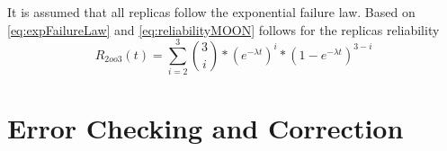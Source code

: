 It is assumed that all replicas follow the exponential failure law.
Based on \autoref{eq:expFailureLaw} and \autoref{eq:reliabilityMOON} follows for the replicas reliability
\begin{equation}
R_{2oo3}(t) = \sum_{i = 2}^3 {3 \choose i} * (e^{-\lambda t})^i * (1 - e^{-\lambda t})^{3 - i}
\end{equation}

%
%
%


\section{Error Checking and Correction}







\fi
